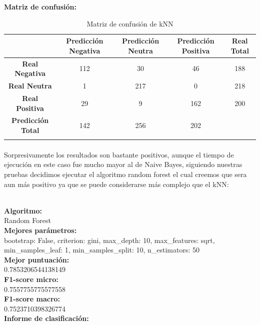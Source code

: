 \documentclass{report}
\begin{document}
{\begin{center}
{                    \textbf{Matriz de confusión: }


                    \begin{longtable}{|c|c|c|c|c|}
                    \hline
                     & \textbf{Predicción Negativa} & \textbf{Predicción Neutra} & \textbf{Predicción Positiva} & \textbf{Real Total} \\ \hline
                    \endhead
                    \textbf{Real Negativa} & 112 & 30 & 46 & 188\\ \hline
                    \textbf{Real Neutra} & 1 & 217 & 0 & 218\\ \hline
                    \textbf{Real Positiva} & 29 & 9 & 162 & 200\\ \hline
                    \textbf{Predicción Total} & 142 & 256 & 202  & \\
                    \hline
                    \caption{Matriz de confusión de kNN}
                    \end{longtable}}
                    \end{center}
                \paragraph*{}{
                   Sorpresivamente los resultados son bastante positivos, aunque el tiempo de ejecución en este caso fue mucho mayor al de Naive Bayes, siguiendo nuestras pruebas decidimos ejecutar el algoritmo random forest el cual creemos que sera aun más positivo ya que se puede considerarse más complejo que el kNN:
                }
                     \\
                    \phantom{}
                    \\
                    \begin{center} {
                    \textbf{Algoritmo: }
                    \\
                    Random Forest
                    \\
                    \textbf{Mejores parámetros: }
                    \\
                    bootstrap: False, criterion: gini, max\_depth: 10, max\_features: sqrt, min\_samples\_leaf: 1, min\_samples\_split: 10, n\_estimators: 50
                    \\
                    \textbf{Mejor puntuación: }
                    \\
                    0.7853206544138149
                    \\
                    \textbf{F1-score micro: }
                    \\
                    0.7557755775577558
                    \\
                    \textbf{F1-score macro: }
                    \\
                    0.7523710398326774
                    \\
                    \textbf{Informe de clasificación: }

}
\end{center}}
\end{document}
